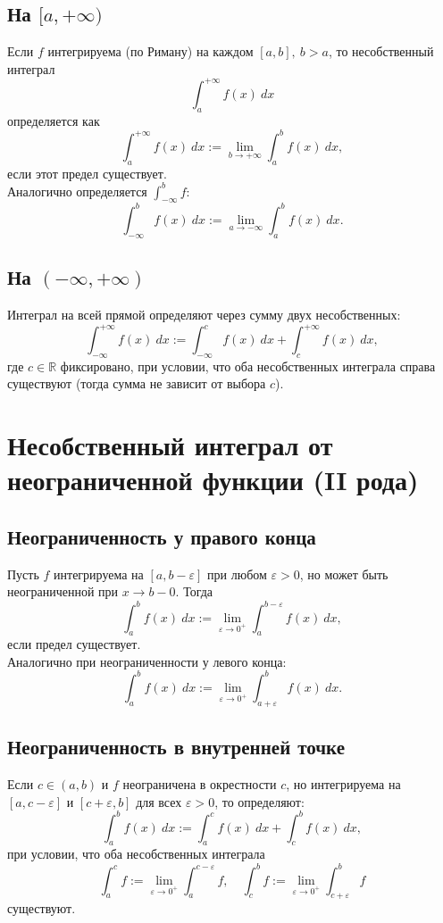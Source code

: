 \documentclass[14pt]{extreport}
\begin{document}
    \subsection{На $[a,+\infty)$}
    Если $f$ интегрируема (по Риману) на каждом $[a,b],\ b>a$, то несобственный интеграл
    \[
    \int_a^{+\infty} f(x)\ dx
    \]
    определяется как
    \[
    \int_a^{+\infty} f(x)\ dx := \lim_{b \rightarrow +\infty} \int_a^b f(x)\ dx,
    \]
    если этот предел существует.\\
    Аналогично определяется $\int_{-\infty}^b f$:
    \[
    \int_{-\infty}^b f(x)\ dx := \lim_{a \rightarrow -\infty} \int_a^b f(x)\ dx.
    \]

    \subsection{На $(-\infty, +\infty)$}
    Интеграл на всей прямой определяют через сумму двух несобственных:
    \[
    \int_{-\infty}^{+\infty} f(x)\ dx := \int_{-\infty}^c f(x)\ dx + \int_c^{+\infty} f(x)\ dx,
    \]
    где $c \in \mathbb{R}$ фиксировано, при условии, что оба несобственных интеграла справа существуют (тогда сумма не зависит от выбора $c$).

    \section{Несобственный интеграл от неограниченной функции (II рода)}
    \subsection{Неограниченность у правого конца}
    Пусть $f$ интегрируема на $[a,b-\varepsilon]$ при любом $\varepsilon>0$, но может быть неограниченной при $x \rightarrow b-0$. Тогда
    \[
    \int_a^b f(x)\ dx := \lim_{\varepsilon \rightarrow 0^+} \int_a^{b-\varepsilon} f(x)\ dx,
    \]
    если предел существует.\\
    Аналогично при неограниченности у левого конца:
    \[
    \int_a^b f(x)\ dx := \lim_{\varepsilon \rightarrow 0^+} \int_{a+\varepsilon}^b f(x)\ dx.
    \]

    \subsection{ Неограниченность в внутренней точке}
    Если $c \in (a,b)$ и $f$ неограничена в окрестности $c$, но интегрируема на $[a,c-\varepsilon]$ и $[c+\varepsilon,b]$ для всех $\varepsilon>0$, то определяют:
    \[
    \int_a^b f(x)\ dx := \int_a^c f(x)\ dx + \int_c^b f(x)\ dx,
    \]
    при условии, что оба несобственных интеграла
    \[
    \int_a^c f := \lim_{\varepsilon \rightarrow 0^+} \int_a^{c-\varepsilon} f, \quad \int_c^b f := \lim_{\varepsilon \rightarrow 0^+} \int_{c+\varepsilon}^b f
    \]
    существуют.
\end{document}
